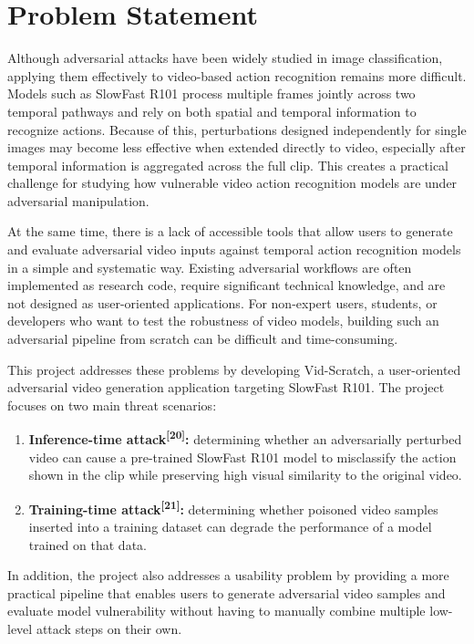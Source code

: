 \section{Problem Statement}
\label{section:problem-statement}

Although adversarial attacks have been widely studied in image classification, applying them effectively to video-based action recognition remains more difficult. Models such as SlowFast R101 process multiple frames jointly across two temporal pathways and rely on both spatial and temporal information to recognize actions. Because of this, perturbations designed independently for single images may become less effective when extended directly to video, especially after temporal information is aggregated across the full clip. This creates a practical challenge for studying how vulnerable video action recognition models are under adversarial manipulation. \newline

At the same time, there is a lack of accessible tools that allow users to generate and evaluate adversarial video inputs against temporal action recognition models in a simple and systematic way. Existing adversarial workflows are often implemented as research code, require significant technical knowledge, and are not designed as user-oriented applications. For non-expert users, students, or developers who want to test the robustness of video models, building such an adversarial pipeline from scratch can be difficult and time-consuming. \newline

This project addresses these problems by developing Vid-Scratch, a user-oriented adversarial video generation application targeting SlowFast R101. The project focuses on two main threat scenarios:

\begin{enumerate}
    \item \textbf{Inference-time attack\textsuperscript{[20]}:} determining whether an adversarially perturbed video can cause a pre-trained SlowFast R101 model to misclassify the action shown in the clip while preserving high visual similarity to the original video.
    \item \textbf{Training-time attack\textsuperscript{[21]}:} determining whether poisoned video samples inserted into a training dataset can degrade the performance of a model trained on that data.
\end{enumerate}

In addition, the project also addresses a usability problem by providing a more practical pipeline that enables users to generate adversarial video samples and evaluate model vulnerability without having to manually combine multiple low-level attack steps on their own.

